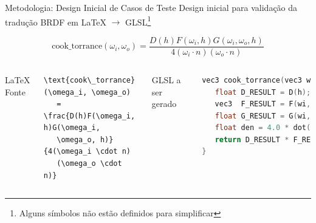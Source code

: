 \begin{frame}[fragile]{Metodologia: Design Inicial de Casos de Teste}
    Design inicial para validação da tradução BRDF em \LaTeX{} $\to$ GLSL\footnote{\tiny{Alguns símbolos não estão definidos para simplificar}}

   { \small
   \begin{equation*}
       \text{cook\_torrance}(\omega_i, \omega_o) = \frac{D(h)F(\omega_i, h)G(\omega_i, \omega_o, h)}{4(\omega_i \cdot n)(\omega_o \cdot n)}
   \end{equation*}
   }

    \vspace{1cm}
   \begin{columns}
       
       \LaTeX{} Fonte
       \begin{lstlisting}[basicstyle=\scriptsize]
\text{cook\_torrance}(\omega_i, \omega_o)
   = \frac{D(h)F(\omega_i, h)G(\omega_i,
   \omega_o, h)}{4(\omega_i \cdot n)
   (\omega_o \cdot n)}
       \end{lstlisting}
       
       GLSL a ser gerado
       \begin{lstlisting}[language=C, basicstyle=\tiny]
vec3 cook_torrance(vec3 wi, vec3 wo) {
   float D_RESULT = D(h);
   vec3  F_RESULT = F(wi, wo);
   float G_RESULT = G(wi, wo, h);
   float den = 4.0 * dot(n, wi) * dot(n, wo);
   return D_RESULT * F_RESULT * G_RESULT / den;
}
       \end{lstlisting}
   \end{columns}
   

\end{frame}

